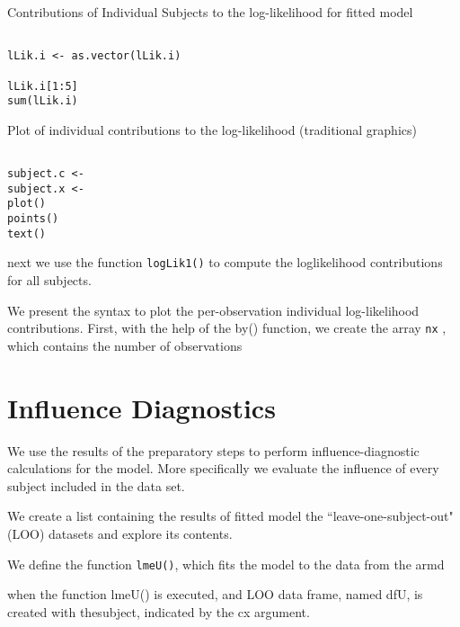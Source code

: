 \documentclass[a4paper,12pt]{article}
\begin{document}
Contributions of Individual Subjects to the log-likelihood for fitted model


\begin{framed}
\begin{verbatim}

lLik.i <- as.vector(lLik.i)

lLik.i[1:5]
sum(lLik.i)

\end{verbatim}
\end{framed}

Plot of individual contributions to the log-likelihood (traditional graphics)
\begin{framed}
\begin{verbatim}

subject.c <-
subject.x <- 
plot()
points()
text()
\end{verbatim}
\end{framed}

next we use the function \texttt{logLik1()} to compute the loglikelihood
contributions for all subjects.

We present the syntax to plot the per-observation individual log-likelihood contributions.
First, with the help of the by() function, we create the array \texttt{nx} , which contains the number
of observations


\section{Influence Diagnostics}

We use the results of the preparatory steps to perform influence-diagnostic calculations for the model.
More specifically we evaluate the influence of every subject included in the data set.


We create a list containing the results of fitted model the ``leave-one-subject-out" (LOO)
datasets and explore its contents.

We define the function \texttt{lmeU()}, which fits the model to the data from the armd

when the function lmeU() is executed, and LOO data frame, named dfU, is created with thesubject, indicated by the cx argument.
\end{document}
